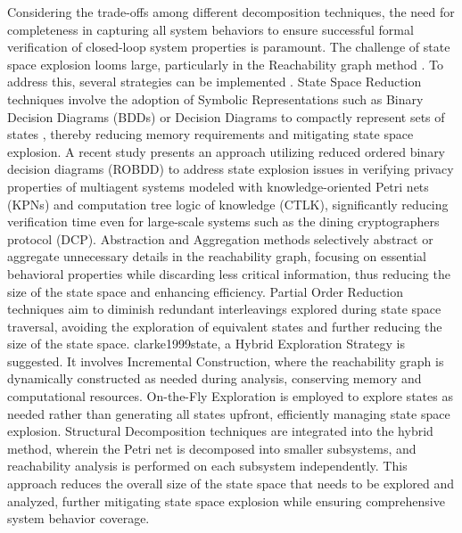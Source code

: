 \begin{bibunit}
Considering the trade-offs among different decomposition techniques, the need for completeness in capturing all system behaviors to ensure successful formal verification of closed-loop system properties is paramount. The challenge of state space explosion looms large, particularly in the Reachability graph method \cite{zambon2012graph, apel2016fly}. To address this, several strategies can be implemented \cite{xin2009methods}. State Space Reduction techniques involve the adoption of Symbolic Representations such as Binary Decision Diagrams (BDDs)  or Decision Diagrams to compactly represent sets of states \cite{shrestha2009decision}, thereby reducing memory requirements and mitigating state space explosion. A recent study \cite{he2022petri} presents an approach utilizing reduced ordered binary decision diagrams (ROBDD) to address state explosion issues in verifying privacy properties of multiagent systems modeled with knowledge-oriented Petri nets (KPNs) and computation tree logic of knowledge (CTLK), significantly reducing verification time even for large-scale systems such as the dining cryptographers protocol (DCP). Abstraction and Aggregation methods \cite{ludtke2018state} selectively abstract or aggregate unnecessary details in the reachability graph, focusing on essential behavioral properties while discarding less critical information, thus reducing the size of the state space and enhancing efficiency. Partial Order Reduction techniques \cite{godefroid1996partial, clarke1999state} aim to diminish redundant interleavings explored during state space traversal, avoiding the exploration of equivalent states and further reducing the size of the state space. clarke1999state,  a Hybrid Exploration Strategy is suggested. It involves Incremental Construction, where the reachability graph is dynamically constructed as needed during analysis, conserving memory and computational resources. On-the-Fly Exploration is employed to explore states as needed rather than generating all states upfront, efficiently managing state space explosion. Structural Decomposition techniques are integrated into the hybrid method, wherein the Petri net is decomposed into smaller subsystems, and reachability analysis is performed on each subsystem independently. This approach reduces the overall size of the state space that needs to be explored and analyzed, further mitigating state space explosion while ensuring comprehensive system behavior coverage.


\end{bibunit}
